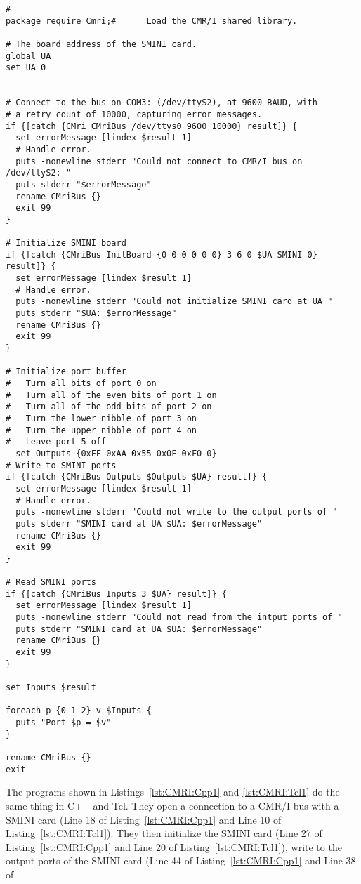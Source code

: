 \begin{lstlisting}[caption={Using the CMR/I from Tcl},
		   label=lst:CMRI:Tcl1]
#
package require Cmri;#		Load the CMR/I shared library.

# The board address of the SMINI card.
global UA
set UA 0


# Connect to the bus on COM3: (/dev/ttyS2), at 9600 BAUD, with
# a retry count of 10000, capturing error messages.
if {[catch {CMri CMriBus /dev/ttys0 9600 10000} result]} {
  set errorMessage [lindex $result 1]
  # Handle error.
  puts -nonewline stderr "Could not connect to CMR/I bus on /dev/ttyS2: "
  puts stderr "$errorMessage"
  rename CMriBus {}
  exit 99
}

# Initialize SMINI board
if {[catch {CMriBus InitBoard {0 0 0 0 0 0} 3 6 0 $UA SMINI 0} result]} {
  set errorMessage [lindex $result 1]
  # Handle error.
  puts -nonewline stderr "Could not initialize SMINI card at UA "
  puts stderr "$UA: $errorMessage"
  rename CMriBus {}
  exit 99
}

# Initialize port buffer
#	Turn all bits of port 0 on 
#	Turn all of the even bits of port 1 on
#	Turn all of the odd bits of port 2 on
#	Turn the lower nibble of port 3 on
#	Turn the upper nibble of port 4 on
#	Leave port 5 off
  set Outputs {0xFF 0xAA 0x55 0x0F 0xF0 0}
# Write to SMINI ports
if {[catch {CMriBus Outputs $Outputs $UA} result]} {
  set errorMessage [lindex $result 1]
  # Handle error.
  puts -nonewline stderr "Could not write to the output ports of "
  puts stderr "SMINI card at UA $UA: $errorMessage"
  rename CMriBus {}
  exit 99
}

# Read SMINI ports
if {[catch {CMriBus Inputs 3 $UA} result]} {
  set errorMessage [lindex $result 1]
  puts -nonewline stderr "Could not read from the intput ports of "
  puts stderr "SMINI card at UA $UA: $errorMessage"
  rename CMriBus {}
  exit 99
}

set Inputs $result

foreach p {0 1 2} v $Inputs {
  puts "Port $p = $v"
}

rename CMriBus {} 
exit 
\end{lstlisting} 
The programs shown in Listings~\ref{lst:CMRI:Cpp1} and
\ref{lst:CMRI:Tcl1} do the same thing in C++ and Tcl.  They open a
connection to a CMR/I bus with a SMINI card (Line 18 of
Listing~\ref{lst:CMRI:Cpp1} and Line 10 of
Listing~\ref{lst:CMRI:Tcl1}). They then initialize the SMINI card (Line
27 of Listing~\ref{lst:CMRI:Cpp1} and Line 20 of
Listing~\ref{lst:CMRI:Tcl1}), write to the output ports of the SMINI
card (Line 44 of Listing~\ref{lst:CMRI:Cpp1} and Line 38 of
